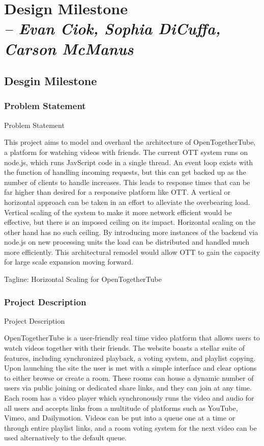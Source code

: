 \chapter{Design Milestone \\
  \small{\textit{-- Evan Ciok, Sophia DiCuffa, Carson McManus}}
  \label{Chapter::designMilestone}}

\section{Desgin Milestone \label{Section::designMilestone}}

\subsection{Problem Statement}
Problem Statement

This project aims to model and overhaul the architecture of OpenTogetherTube, a platform for watching videos with
friends. The current OTT system runs on node.js, which runs JavScript code in a single thread. An event loop exists
with the function of handling incoming requests, but this can get backed up as the number of clients to handle
increases. This leads to response times that can be far higher than desired for a responsive platform like OTT.
A vertical or horizontal approach can be taken in an effort to alleviate the overbearing load. Vertical scaling
of the system to make it more network efficient would be effective, but there is an imposed ceiling on its impact.
Horizontal scaling on the other hand has no such ceiling. By introducing more instances of the backend via
node.js on new processing units the load can be distributed and handled much more efficiently. This architectural
remodel would allow OTT to gain the capacity for large scale expansion moving forward.

Tagline: Horizontal Scaling for OpenTogetherTube

\subsection{Project Description}
Project Description

OpenTogetherTube is a user-friendly real time video platform that allows users to watch videos together with their friends. The website boasts a stellar suite of features, including synchronized playback, a voting system, and playlist copying. Upon launching the site the user is met with a simple interface and clear options to either browse or create a room. These rooms can house a dynamic number of users via public joining or dedicated share links, and they can join at any time. Each room has a video player which synchronously runs the video and audio for all users and accepts links from a multitude of platforms such as YouTube, Vimeo, and Dailymotion. Videos can be put into a queue one at a time or through entire playlist links, and a room voting system for the next video can be used alternatively to the default queue.

